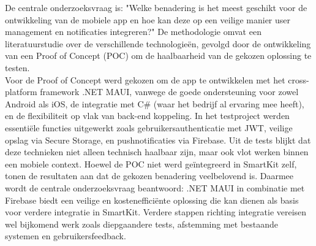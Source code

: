 De centrale onderzoeksvraag is: "Welke benadering is het meest geschikt voor de ontwikkeling van de mobiele app en hoe kan deze op een veilige manier user management en notificaties integreren?" De methodologie omvat een literatuurstudie over de verschillende technologieën, gevolgd door de ontwikkeling van een Proof of Concept (POC) om de haalbaarheid van de gekozen oplossing te testen. \\

Voor de Proof of Concept werd gekozen om de app te ontwikkelen met het cross-platform framework .NET MAUI, vanwege de goede ondersteuning voor zowel Android als iOS, de integratie met C# (waar het bedrijf al ervaring mee heeft), en de flexibiliteit op vlak van back-end koppeling. In het testproject werden essentiële functies uitgewerkt zoals gebruikersauthenticatie met JWT, veilige opslag via Secure Storage, en pushnotificaties via Firebase. Uit de tests blijkt dat deze technieken niet alleen technisch haalbaar zijn, maar ook vlot werken binnen een mobiele context. Hoewel de POC niet werd geïntegreerd in SmartKit zelf, tonen de resultaten aan dat de gekozen benadering veelbelovend is. Daarmee wordt de centrale onderzoeksvraag beantwoord: .NET MAUI in combinatie met Firebase biedt een veilige en kostenefficiënte oplossing die kan dienen als basis voor verdere integratie in SmartKit. Verdere stappen richting integratie vereisen wel bijkomend werk zoals diepgaandere tests, afstemming met bestaande systemen en gebruikersfeedback.
